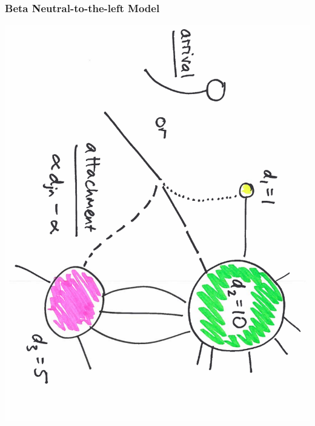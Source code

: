 \documentclass[final,hyperref={pdfpagelabels=false},noamsthm]{beamer}
\begin{document}
\begin{frame}
	\frametitle{Beta Neutral-to-the-left Model \cite{Bloem2017}}
	\vspace{2pt}
	\includegraphics[angle=90,origin=c,scale=0.37]{fig/bntl}
\end{frame}

%
\end{document}
